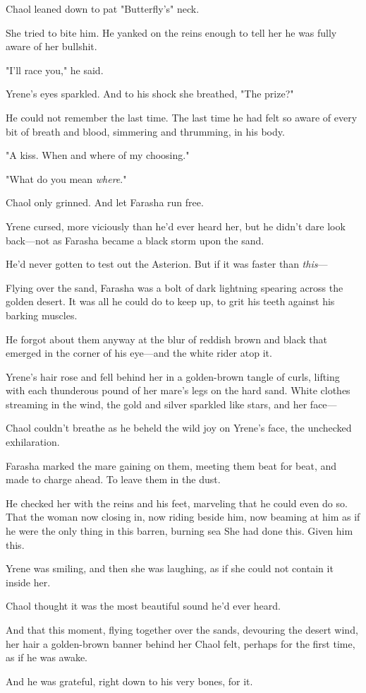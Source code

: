 Chaol leaned down to pat "Butterfly's" neck.

She tried to bite him. He yanked on the reins enough to tell her he was fully aware of her bullshit.

"I'll race you," he said.

Yrene's eyes sparkled. And to his shock she breathed, "The prize?"

He could not remember the last time. The last time he had felt so aware of every bit of breath and blood, simmering and thrumming, in his body.

"A kiss. When and where of my choosing."

"What do you mean \emph{where}."

Chaol only grinned. And let Farasha run free.

Yrene cursed, more viciously than he'd ever heard her, but he didn't dare look back---not as Farasha became a black storm upon the sand.

He'd never gotten to test out the Asterion. But if it was faster than
\emph{this}---

Flying over the sand, Farasha was a bolt of dark lightning spearing across the golden desert. It was all he could do to keep up, to grit his teeth against his barking muscles.

He forgot about them anyway at the blur of reddish brown and black that emerged in the corner of his eye---and the white rider atop it.

Yrene's hair rose and fell behind her in a golden-brown tangle of curls, lifting with each thunderous pound of her mare's legs on the hard sand. White clothes streaming in the wind, the gold and silver sparkled like stars, and her face---

Chaol couldn't breathe as he beheld the wild joy on Yrene's face, the unchecked exhilaration.

Farasha marked the mare gaining on them, meeting them beat for beat, and made to charge ahead. To leave them in the dust.

He checked her with the reins and his feet, marveling that he could even do so. That the woman now closing in, now riding beside him, now beaming at him as if he were the only thing in this barren, burning sea 
She had done this. Given him this.

Yrene was smiling, and then she was laughing, as if she could not contain it inside her.

Chaol thought it was the most beautiful sound he'd ever heard.

And that this moment, flying together over the sands, devouring the desert wind, her hair a golden-brown banner behind her  Chaol felt, perhaps for the first time, as if he was awake.

And he was grateful, right down to his very bones, for it.


